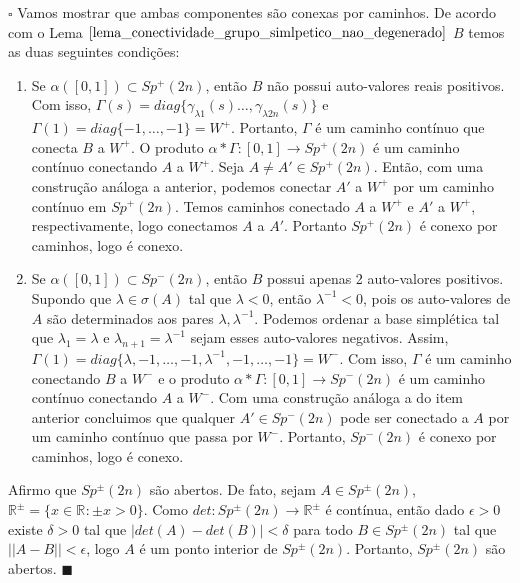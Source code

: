 \documentclass[12pt]{book}
\newenvironment{prova}[1]{$\square$ #1}{\hfill$\blacksquare$}
\newcommand{\gruposimpleticonaodegenerado}[1]{Sp^{#1}(2n)}
\newcommand{\intervalo}{[0,1]}
\newcommand{\norma}[1]{||#1||}
\newcommand{\real}[1]{\mathbb{R}^{#1}}
\newcommand{\reta}{\real{}}
\begin{document}
\begin{prova}
		Vamos mostrar que ambas componentes são conexas por caminhos. De acordo com o Lema $\ref{lema_conectividade_grupo_simlpetico_nao_degenerado}$ $B$ temos as duas seguintes condições:
		\begin{enumerate}
			\item Se $\alpha([0,1]) \subset \gruposimpleticonaodegenerado{+}$, então $B$ não possui auto-valores reais positivos. Com isso, $\Gamma(s) = diag\{\gamma_{\lambda{1}}(s)\dots, \gamma_{\lambda{2n}}(s)\}$ e $\Gamma(1) = diag \{-1, \dots, -1\} = W^{+}$. Portanto, $\Gamma$ é um caminho contínuo que conecta $B$ a $W^{+}$. O produto $\alpha * \Gamma:\intervalo \to \gruposimpleticonaodegenerado{+}$
			é um caminho contínuo conectando $A$ a $W^{+}$. Seja $A\neq A' \in \gruposimpleticonaodegenerado{+}$. Então, com uma construção análoga a anterior, podemos conectar $A'$ a $W^{+}$ por um caminho contínuo em $\gruposimpleticonaodegenerado{+}$. Temos caminhos conectado $A$ a $W^{+}$ e $A'$ a $W^{+}$, respectivamente, logo conectamos $A$ a $A'$. Portanto $\gruposimpleticonaodegenerado{+}$ é conexo por caminhos, logo é conexo.
			
			\item Se $\alpha([0,1]) \subset \gruposimpleticonaodegenerado{-}$, então $B$ possui apenas 2 auto-valores positivos. Supondo que $\lambda \in \sigma(A)$ tal que $\lambda<0$, então $\lambda^{-1} < 0$, pois os auto-valores de $A$ são determinados aos pares $\lambda, \lambda^{-1}$. Podemos ordenar a base simplética tal que $\lambda_{1}=\lambda$ e $\lambda_{n+1}=\lambda^{-1}$ sejam esses auto-valores negativos. Assim, $\Gamma(1) = diag\{\lambda, -1, \dots, -1, \lambda^{-1}, -1, \dots, -1\} = W^{-}$. Com isso, $\Gamma$ é um caminho conectando $B$ a $W^{-}$ e o produto $\alpha * \Gamma: \intervalo \to \gruposimpleticonaodegenerado{-}$ é um caminho contínuo conectando $A$ a $W^{-}$. Com uma construção análoga a do item anterior concluimos que qualquer $A' \in \gruposimpleticonaodegenerado{-}$ pode ser conectado a $A$ por um caminho contínuo que passa por $W^{-}$. Portanto, $\gruposimpleticonaodegenerado{-}$ é conexo por caminhos, logo é conexo.
		\end{enumerate}
		
		Afirmo que $\gruposimpleticonaodegenerado{\pm}$ são abertos. De fato, sejam $A \in \gruposimpleticonaodegenerado{\pm}$, $\real{\pm } = \{x \in \reta: \pm x> 0 \}$. Como $det: \gruposimpleticonaodegenerado{\pm}\to\real{\pm }$ é contínua, então dado $\epsilon>0$ existe $\delta>0$ tal que $|det(A)-det(B)|<\delta$ para todo $B \in \gruposimpleticonaodegenerado{\pm }$ tal que $\norma{A-B}<\epsilon$, logo $A$ é um ponto interior de $\gruposimpleticonaodegenerado{\pm}$. Portanto, $\gruposimpleticonaodegenerado{\pm}$ são abertos.
	\end{prova}
	
\end{document}
